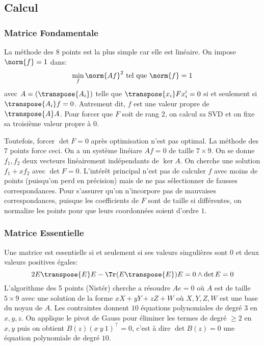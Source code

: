 \documentclass[info, math]{mpb-cours}
\begin{document}
\subsection{Calcul}
\subsubsection{Matrice Fondamentale}
La méthode des $8$ points est la plus simple car elle est linéaire. On impose $\norm{f} = 1$ dans:
\begin{equation*}
	\min_{f} \norm{Af}^{2} \text{ tel que } \norm{f} = 1
\end{equation*}
avec $A = (\transpose{A_{i}})$ telle que $\transpose{x_{i}}Fx_{i}' = 0$ si et seulement si $\transpose{A_{i}} f =0$.
Autrement dit, $f$ est une valeur propre de $\transpose{A}A$. Pour forcer que $F$ soit de rang $2$, on calcul sa SVD et on fixe sa troisième valeur propre à $0$.

Toutefois, forcer $\det F = 0$ après optimisation n'est pas optimal. La méthode des $7$ points force ceci.
On a un système linéiare $Af = 0$ de taille $7\times 9$.
On se donne $f_{1}, f_{2}$ deux vecteurs linéairement indépendants de $\ker A$.
On cherche une solution $f_{1} + xf_{2}$ avec $\det F = 0$.
L'intérêt principal n'est pas de calculer $f$ avec moins de points (puisqu'on perd en précision) mais de ne pas sélectionner de fausses correspondances.
Pour s'assurer qu'on n'incorpore pas de mauvaises correspondances, puisque les coefficients de $F$ sont de taille si différentes,
on normalize les points pour que leurs coordonnées soient d'ordre $1$.

\subsubsection{Matrice Essentielle}
Une matrice est essentielle si et seulement si ses valeurs singulières sont $0$ et deux valeurs positives égales:
\begin{equation*}
	2E\transpose{E}E - \Tr(E\transpose{E})E = 0 \land \det E = 0
\end{equation*}
L'algorithme des 5 points (Nistér) cherche a résoudre $Ae = 0$ où $A$ est de taille $5 \times 9$ avec une solution de la forme $xX + yY + zZ + W$ où $X, Y, Z, W$ est une base du noyau de $A$.
Les contraintes donnent $10$ équations polynomiales de degré $3$ en $x, y, z$.
On applique le pivot de Gauss pour éliminer les termes de degré $\geq 2$ en $x, y$ puis on obtient $B(z)(x \ y \ 1)^{\top} = 0$, c'est à dire $\det B(z) = 0$ une équation polynomiale de degré $10$.
\end{document}
